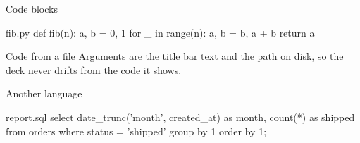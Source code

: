 \begin{frame}[fragile]{Code blocks}
    \begin{codebox}[language=Python]{fib.py}
def fib(n):
    a, b = 0, 1
    for _ in range(n):
        a, b = b, a + b
    return a
    \end{codebox}
\end{frame}

\begin{frame}[fragile]{Code from a file}
    {\small Arguments are the title bar text and the path on disk, so the deck
    never drifts from the code it shows.}

    \vspace{0.2cm}
\end{frame}

\begin{frame}[fragile]{Another language}
    \begin{codebox}[language=SQL]{report.sql}
select date_trunc('month', created_at) as month, count(*) as shipped
from orders
where status = 'shipped'
group by 1
order by 1;
    \end{codebox}
\end{frame}

